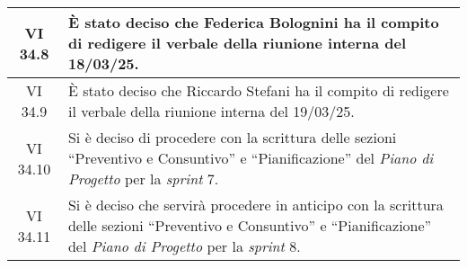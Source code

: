 \begin{table}[htbp]
\begin{tabular}{|c|p{}|}
        \hline
        VI 34.8 & È stato deciso che Federica Bolognini ha il compito di redigere il verbale della riunione interna del 18/03/25.\\
        \hline
        VI 34.9 & È stato deciso che Riccardo Stefani ha il compito di redigere il verbale della riunione interna del 19/03/25.\\
        \hline
        VI 34.10 & Si è deciso di procedere con la scrittura delle sezioni “Preventivo e Consuntivo” e “Pianificazione” del \emph{Piano di Progetto} per la \emph{sprint} 7.\\
        \hline
        VI 34.11 & Si è deciso che servirà procedere in anticipo con la scrittura delle sezioni “Preventivo e Consuntivo” e “Pianificazione” del \emph{Piano di Progetto} per la \emph{sprint} 8.\\
        \hline
    \end{tabular}
\end{table}


